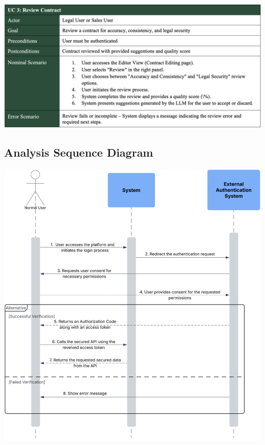 \begin{center}
    \centering
    \includegraphics[width=1\textwidth]{Images/Review Contract Use Case.png}
    \label{tab:review_contract_use_case}
\end{center}

\subsection{Analysis Sequence Diagram}

\begin{center}
    \centering
    \includegraphics[width=1\textwidth]{Images/Analysis Sequence Diagram.png}
    \label{fig:analysis_sequence_diagram}
\end{center}


